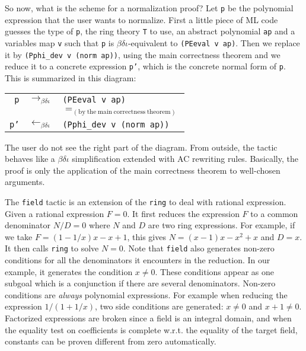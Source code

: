 So now, what is the scheme for a normalization proof? Let \texttt{p}
be the polynomial expression that the user wants to normalize. First a
little piece of ML code guesses the type of \texttt{p}, the ring
theory \texttt{T} to use, an abstract polynomial \texttt{ap} and a
variables map \texttt{v} such that \texttt{p} is
$\beta\delta\iota$-equivalent to \verb|(PEeval v ap)|. Then we
replace it by \verb|(Pphi_dev v (norm ap))|, using the
main correctness theorem and we reduce it to a concrete expression
\texttt{p'}, which is the concrete normal form of
\texttt{p}. This is summarized in this diagram:
\begin{center}
\begin{tabular}{rcl}
\texttt{p} & $\rightarrow_{\beta\delta\iota}$  
   & \texttt{(PEeval v ap)} \\
 & & $=_{\mathrm{(by\ the\ main\ correctness\ theorem)}}$ \\
\texttt{p'} 
   & $\leftarrow_{\beta\delta\iota}$ 
   & \texttt{(Pphi\_dev v (norm ap))}
\end{tabular}
\end{center}
The user do not see the right part of the diagram. 
From outside, the tactic behaves like a
$\beta\delta\iota$ simplification extended with AC rewriting rules.
Basically, the proof is only the application of the main
correctness theorem to well-chosen arguments.




The {\tt field} tactic is  an extension of the {\tt ring} to deal with
rational expression. Given a rational expression $F=0$. It first reduces the
expression $F$ to a common denominator $N/D= 0$ where $N$ and $D$ are two ring
expressions.
For example, if we take $F = (1 - 1/x) x - x + 1$, this gives 
$ N= (x -1)  x - x^2 + x$ and $D= x$. It then calls {\tt ring} 
to solve $N=0$. Note that {\tt field} also generates non-zero conditions
for all the denominators it encounters in the reduction.
In our example, it generates the condition $x \neq 0$. These
conditions appear as one subgoal which is a conjunction if there are
several denominators.
Non-zero conditions are {\it always} polynomial expressions. For example 
when reducing the expression $1/(1 + 1/x)$, two side conditions are
generated: $x\neq 0$ and $x + 1 \neq 0$. Factorized expressions are
broken since a field is an integral domain, and when the equality test
on coefficients is complete w.r.t. the equality of the target field,
constants can be proven different from zero automatically.

